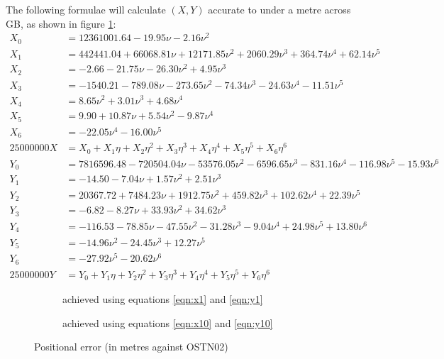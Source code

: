 \documentclass[10pt,a4paper]{article}
\def\gap{\hspace{2cm}}
\begin{document}
The following formulae will calculate $(X,Y)$ accurate to under a metre across
GB, as shown in figure \ref{fig:grid_to_wm_1m}:
\begin{align}
X_0 &= 12361001.64 -19.95\nu -2.16\nu^2\nonumber \\
X_1 &= 442441.04 +66068.81\nu +12171.85\nu^2 +2060.29\nu^3 +364.74\nu^4 +62.14\nu^5\nonumber \\
X_2 &= -2.66 -21.75\nu -26.30\nu^2 +4.95\nu^3\nonumber \\
X_3 &= -1540.21 -789.08\nu -273.65\nu^2 -74.34\nu^3 -24.63\nu^4 -11.51\nu^5\nonumber \\
X_4 &= 8.65\nu^2 +3.01\nu^3 +4.68\nu^4\nonumber \\
X_5 &= 9.90 +10.87\nu +5.54\nu^2 -9.87\nu^4\nonumber \\
X_6 &= -22.05\nu^4 -16.00\nu^5\nonumber \\
25000000 X &= X_0 +X_1\eta +X_2\eta^2 +X_3\eta^3 +X_4\eta^4 +X_5\eta^5 +X_6\eta^6
  \label{eqn:x1}
\\[1ex]
Y_0 &= 7816596.48 -720504.04\nu -53576.05\nu^2 -6596.65\nu^3 -831.16\nu^4 -116.98\nu^5 -15.93\nu^6\nonumber \\
Y_1 &= -14.50 -7.04\nu +1.57\nu^2 +2.51\nu^3\nonumber \\
Y_2 &= 20367.72 +7484.23\nu +1912.75\nu^2 +459.82\nu^3 +102.62\nu^4 +22.39\nu^5\nonumber \\
Y_3 &= -6.82 -8.27\nu +33.93\nu^2 +34.62\nu^3\nonumber \\
Y_4 &= -116.53 -78.85\nu -47.55\nu^2 -31.28\nu^3 -9.04\nu^4 +24.98\nu^5 +13.80\nu^6\nonumber \\
Y_5 &= -14.96\nu^2 -24.45\nu^3 +12.27\nu^5\nonumber \\
Y_6 &= -27.92\nu^5 -20.62\nu^6\nonumber \\
25000000 Y &= Y_0 +Y_1\eta +Y_2\eta^2 +Y_3\eta^3 +Y_4\eta^4 +Y_5\eta^5 +Y_6\eta^6
  \label{eqn:y1}
\end{align}

\begin{figure}[htb]
  \begin{subfigure}[b]{0.4\textwidth}
  \centering
  \fbox{
    
  }
  \caption{achieved using equations \eqref{eqn:x1} and \eqref{eqn:y1}}
  \label{fig:grid_to_wm_1m}
\end{subfigure}
\gap
  \begin{subfigure}[b]{0.4\textwidth}
  \centering
  \fbox{
    
  }
  \caption{achieved using equations \eqref{eqn:x10} and \eqref{eqn:y10}}
  \label{fig:grid_to_wm_10m}
\end{subfigure}
  \caption{Positional error (in metres against OSTN02)}
\hrulefill
\end{figure}
\end{document}
